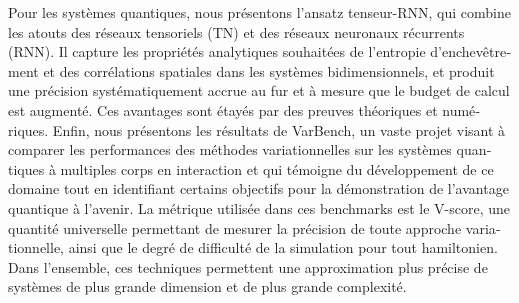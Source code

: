 \begin{otherlanguage}{french}
Pour les systèmes quantiques, nous présentons l'ansatz tenseur-RNN, qui combine les atouts des réseaux tensoriels (TN) et des réseaux neuronaux récurrents (RNN).
Il capture les propriétés analytiques souhaitées de l'entropie d'enchevêtrement et des corrélations spatiales dans les systèmes bidimensionnels, et produit une précision systématiquement accrue au fur et à mesure que le budget de calcul est augmenté. Ces avantages sont étayés par des preuves théoriques et numériques. Enfin, nous présentons les résultats de VarBench, un vaste projet visant à comparer les performances des méthodes variationnelles sur les systèmes quantiques à multiples corps en interaction et qui témoigne du développement de ce domaine tout en identifiant certains objectifs pour la démonstration de l'avantage quantique à l'avenir. La métrique utilisée dans ces benchmarks est le V-score, une quantité universelle permettant de mesurer la précision de toute approche variationnelle, ainsi que le degré de difficulté de la simulation pour tout hamiltonien. Dans l'ensemble, ces techniques permettent une approximation plus précise de systèmes de plus grande dimension et de plus grande complexité.

\end{otherlanguage}
